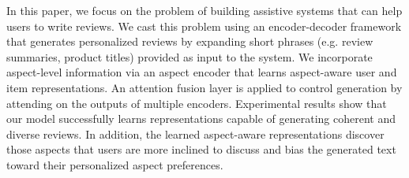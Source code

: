 In this paper, we focus on the problem of building assistive systems that can help users to write reviews. We cast this problem using an encoder-decoder framework that generates personalized reviews by expanding short phrases (e.g. review summaries, product titles) provided as input to the system. We incorporate aspect-level information via an aspect encoder that learns aspect-aware user and item representations. An attention fusion layer is applied to control generation by attending on the outputs of multiple encoders. Experimental results show that our model successfully learns representations capable of generating coherent and diverse reviews. In addition, the learned aspect-aware representations discover those aspects that users are more inclined to discuss and bias the generated text toward their personalized aspect preferences.
